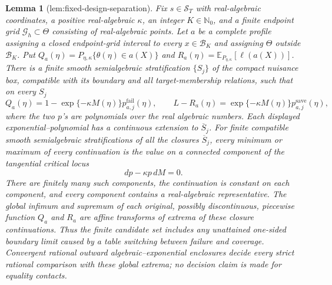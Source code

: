 \documentclass{article}
\newtheorem{lemma}{Lemma}
\begin{document}
\begin{lemma}[lem:fixed-design-separation]\label{lem:fixed-design-separation}
Fix \(s\in\mathcal S_T\) with real-algebraic coordinates, a positive real-algebraic \(\kappa\), an integer \(K\in\mathbb N_0\), and a finite endpoint grid \(\mathcal G_h\subset\Theta\) consisting of real-algebraic points. Let \(a\) be a complete profile assigning a closed endpoint-grid interval to every \(x\in\mathcal B_K\) and assigning \(\Theta\) outside \(\mathcal B_K\). Put \(Q_a(\eta)=P_{\eta,\kappa}\{\theta(\eta)\in a(X)\}\) and \(R_a(\eta)=\mathbb E_{P_{\eta,\kappa}}[\ell(a(X))]\). There is a finite smooth semialgebraic stratification \(\{S_j\}\) of the compact nuisance box, compatible with its boundary and all target-membership relations, such that on every \(S_j\)
\[
Q_a(\eta)=1-\exp\{-\kappa M(\eta)\}p^{\mathrm{fail}}_{a,j}(\eta),
\qquad
L-R_a(\eta)=\exp\{-\kappa M(\eta)\}p^{\mathrm{save}}_{a,j}(\eta),
\]
where the two \(p\)'s are polynomials over the real algebraic numbers. Each displayed exponential--polynomial has a continuous extension to \(\overline S_j\). For finite compatible smooth semialgebraic stratifications of all the closures \(\overline S_j\), every minimum or maximum of every continuation is the value on a connected component of the tangential critical locus
\[
dp-\kappa p\,dM=0.
\]
There are finitely many such components, the continuation is constant on each component, and every component contains a real-algebraic representative. The global infimum and supremum of each original, possibly discontinuous, piecewise function \(Q_a\) and \(R_a\) are affine transforms of extrema of these closure continuations. Thus the finite candidate set includes any unattained one-sided boundary limit caused by a table switching between failure and coverage. Convergent rational outward algebraic--exponential enclosures decide every strict rational comparison with these global extrema; no decision claim is made for equality contacts.
\end{lemma}
\end{document}
